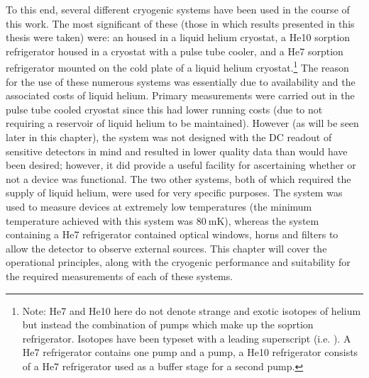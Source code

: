 To this end, several different cryogenic systems have been used in the course of this work. The most significant of these (those in which results presented in this thesis were taken) were: an  housed in a liquid helium cryostat, a He10 sorption refrigerator housed in a cryostat with a pulse tube cooler, and a He7 sorption refrigerator mounted on the cold plate of a liquid helium cryostat.\footnote{Note: He7 and He10 here do not denote strange and exotic isotopes of helium but instead the combination of pumps which make up the soprtion refrigerator. Isotopes have been typeset with a leading superscript (i.e. ). A He7 refrigerator contains one  pump and a  pump, a He10 refrigerator consists of a He7 refrigerator used as a buffer stage for a second  pump.} The reason for the use of these numerous systems was essentially due to availability and the associated costs of liquid helium. Primary measurements were carried out in the pulse tube cooled cryostat since this had lower running costs (due to not requiring a reservoir of liquid helium to be maintained). However (as will be seen later in this chapter), the system was not designed with the DC readout of sensitive detectors in mind and resulted in lower quality data than would have been desired; however, it did provide a useful facility for ascertaining whether or not a device was functional. The two other systems, both of which required the supply of liquid helium, were used for very specific purposes. The  system was used to measure devices at extremely low temperatures (the minimum temperature achieved with this system was $80~\mathrm{mK}$), whereas the system containing a He7 refrigerator contained optical windows, horns and filters to allow the detector to observe external sources. This chapter will cover the operational principles, along with the cryogenic performance and suitability for the required measurements of each of these systems.
%
